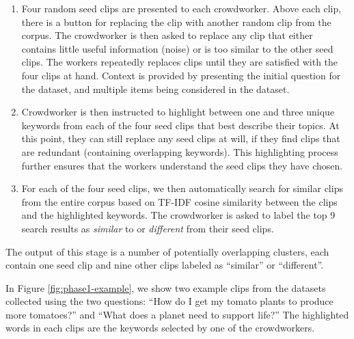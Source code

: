 \begin{enumerate}
	\item Four random seed clips are presented to each crowdworker. Above each
		clip, there is a button for replacing the clip with another random clip
		from the corpus.  The crowdworker is then asked to
		replace any clip that either contains little useful information (noise) or is
		too similar to the other seed clips. The workers repeatedly replaces clips
		until they are satisfied with the four clips at hand. Context is
		provided by presenting the initial question for the dataset,
		and multiple items being considered in the dataset.
	\item Crowdworker is then instructed to highlight between one and three
		unique keywords from each of the four seed clips that best describe
		their topics.  At this point, they can still replace any seed clips at
		will, if they find clips that are redundant (containing overlapping
		keywords). This highlighting process further ensures that the workers
		understand the seed clips they have chosen.
	\item For each of the four seed clips, we then automatically search for
		similar clips from the entire corpus based on TF-IDF cosine similarity
		between the clips and the highlighted keywords. The crowdworker is
		asked to label the top 9 search results as \emph{similar} to or
		\emph{different} from their seed clips.
\end{enumerate}

The output of this stage is a number of potentially overlapping clusters, each
contain one seed clip and nine other clips labeled as ``similar'' or
``different''.


In Figure \ref{fig:phase1-example}, we show two example clips from the datasets
collected using the two questions: ``How do I get my tomato plants to produce
more tomatoes?'' and ``What does a planet need to support life?''
The highlighted words in each clips are the keywords selected by
one of the crowdworkers.

